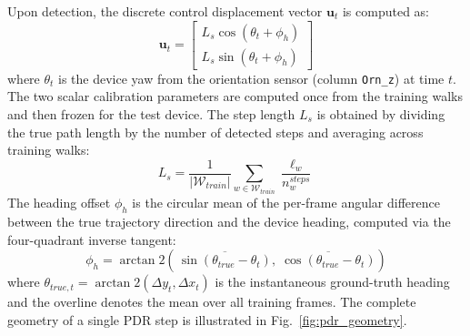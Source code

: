 \documentclass[conference]{IEEEtran}
\begin{document}
Upon detection, the discrete control displacement vector $\mathbf{u}_t$ is computed as:
\begin{equation}
\mathbf{u}_t = \begin{bmatrix} L_s \cos(\theta_t + \phi_h) \\ L_s \sin(\theta_t + \phi_h) \end{bmatrix} \label{eq:pdr}
\end{equation}
where $\theta_t$ is the device yaw from the orientation sensor (column \texttt{Orn\_z}) at time $t$. The two scalar calibration parameters are computed once from the training walks and then frozen for the test device. The step length $L_s$ is obtained by dividing the true path length by the number of detected steps and averaging across training walks:
\begin{equation}
L_s = \frac{1}{|\mathcal{W}_{train}|}\sum_{w \in \mathcal{W}_{train}} \frac{\ell_w}{n_w^{steps}} \label{eq:step_len}
\end{equation}
The heading offset $\phi_h$ is the circular mean of the per-frame angular difference between the true trajectory direction and the device heading, computed via the four-quadrant inverse tangent:
\begin{equation}
\phi_h = \arctan2\!\left(\,\overline{\sin(\theta_{true} - \theta_t)},\; \overline{\cos(\theta_{true} - \theta_t)}\right) \label{eq:phi_h}
\end{equation}
where $\theta_{true,t} = \arctan2(\Delta y_t, \Delta x_t)$ is the instantaneous ground-truth heading and the overline denotes the mean over all training frames. The complete geometry of a single PDR step is illustrated in Fig.~\ref{fig:pdr_geometry}.
\end{document}
